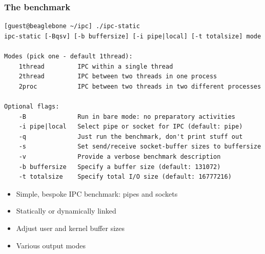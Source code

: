 \begin{frame}[fragile]
  \frametitle{The benchmark}

  \begin{scriptsize}
\begin{verbatim}
[guest@beaglebone ~/ipc] ./ipc-static 
ipc-static [-Bqsv] [-b buffersize] [-i pipe|local] [-t totalsize] mode

Modes (pick one - default 1thread):
    1thread         IPC within a single thread
    2thread         IPC between two threads in one process
    2proc           IPC between two threads in two different processes

Optional flags:
    -B              Run in bare mode: no preparatory activities
    -i pipe|local   Select pipe or socket for IPC (default: pipe)
    -q              Just run the benchmark, don't print stuff out
    -s              Set send/receive socket-buffer sizes to buffersize
    -v              Provide a verbose benchmark description
    -b buffersize   Specify a buffer size (default: 131072)
    -t totalsize    Specify total I/O size (default: 16777216)
\end{verbatim}
  \end{scriptsize}

  \begin{itemize}
    \item Simple, bespoke IPC benchmark: pipes and sockets
    \item Statically or dynamically linked
    \item Adjust user and kernel buffer sizes
    \item Various output modes
  \end{itemize}
\end{frame}

